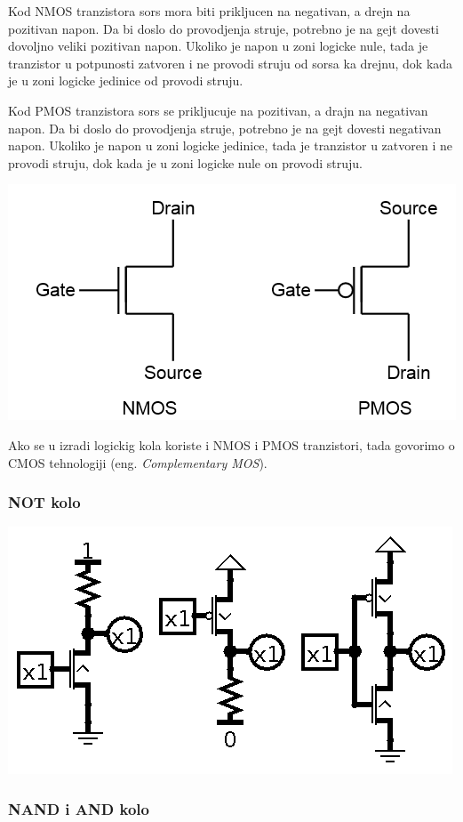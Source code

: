 \documentclass[12p,a4paper]{article}
\begin{document}
\begin{multicols}{2}
    Kod NMOS tranzistora sors mora biti prikljucen na negativan, a drejn na 
    pozitivan napon.
    Da bi doslo do provodjenja struje, potrebno je na gejt dovesti dovoljno 
    veliki pozitivan napon.
    Ukoliko je napon u zoni logicke nule, tada je tranzistor u potpunosti 
    zatvoren i ne provodi struju od sorsa ka drejnu, dok kada je u zoni 
    logicke jedinice od provodi struju.

    Kod PMOS tranzistora sors se prikljucuje na pozitivan, a drajn na 
    negativan napon. 
    Da bi doslo do provodjenja struje, potrebno je na gejt dovesti negativan 
    napon.
    Ukoliko je napon u zoni logicke jedinice, tada je tranzistor u zatvoren i
    ne provodi struju, dok kada je u zoni logicke nule on provodi struju.

    \includegraphics[width=0.8\columnwidth]{Figures/mos.png}

    Ako se u izradi logickig kola koriste i NMOS i PMOS tranzistori, tada
    govorimo o CMOS tehnologiji (eng. \emph{Complementary MOS}).

    \subsubsection{NOT kolo}

    \includegraphics[width=0.7\columnwidth]{Figures/mos_not.png}

    \subsubsection{NAND i AND kolo}


\end{multicols}
\end{document}
